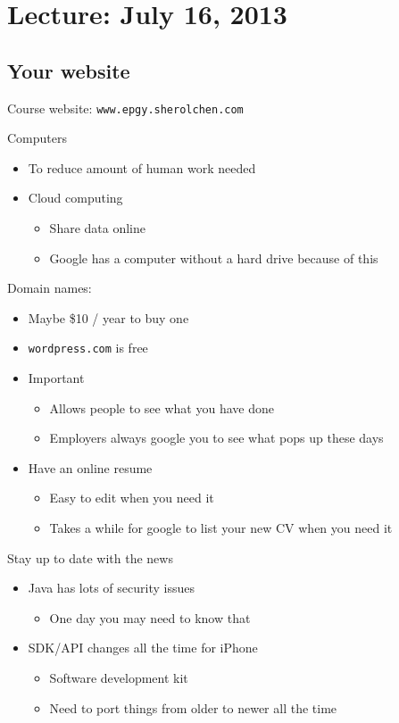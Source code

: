 
\section{Lecture: July 16, 2013}

\subsection{Your website}

Course website: \texttt{www.epgy.sherolchen.com}

Computers
\begin{itemize}
  \item To reduce amount of human work needed
  \item Cloud computing
        \begin{itemize}
          \item Share data online
	   \item Google has a computer without a hard drive because of this
        \end{itemize}
\end{itemize}

Domain names:
\begin{itemize}
  \item Maybe \$10 / year to buy one
  \item \texttt{wordpress.com} is free
  \item Important
        \begin{itemize}
          \item Allows people to see what you have done
	   \item Employers always google you to see what pops up these days 
        \end{itemize}
  \item Have an online resume
        \begin{itemize}
          \item Easy to edit when you need it
	   \item Takes a while for google to list your new CV when you need it
        \end{itemize}
\end{itemize}

Stay up to date with the news
\begin{itemize}
  \item Java has lots of security issues
        \begin{itemize} 
          \item One day you may need to know that
        \end{itemize}
  \item SDK/API changes all the time for iPhone
        \begin{itemize}
          \item Software development kit
	   \item Need to port things from older to newer all the time
        \end{itemize}
\end{itemize}

